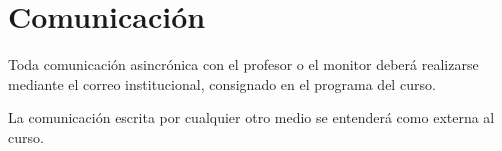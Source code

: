 \section{Comunicación}
Toda comunicación asincrónica con el profesor o el monitor deberá realizarse mediante el correo institucional, consignado en el programa del curso.

La comunicación escrita por cualquier otro medio se entenderá como externa al curso.
